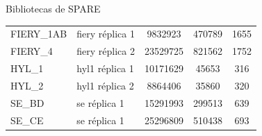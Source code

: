 \documentclass{beamer}
\begin{document}
\begin{frame}{Bibliotecas de SPARE}
\begin{table}[]
\begin{tabular}{llccc}
        FIERY\_1AB                               & fiery réplica 1                          & 9832923                                                                  & 470789                                                                                     & 1655                                                                                              \\
        FIERY\_4                                 & fiery réplica 2                          & 23529725                                                                 & 821562                                                                                     & 1752                                                                                              \\
        HYL\_1                                   & hyl1 réplica 1                           & 10171629                                                                 & 45653                                                                                      & 316                                                                                               \\
        HYL\_2                                   & hyl1 réplica 2                           & 8864406                                                                  & 35860                                                                                      & 320                                                                                               \\
        SE\_BD                                   & se réplica 1                             & 15291993                                                                 & 299513                                                                                     & 639                                                                                               \\
        SE\_CE                                   & se réplica 1                             & 25296809                                                                 & 510438                                                                                     & 693                                                                                              
    \end{tabular}
\end{table}
\end{frame}
\end{document}
